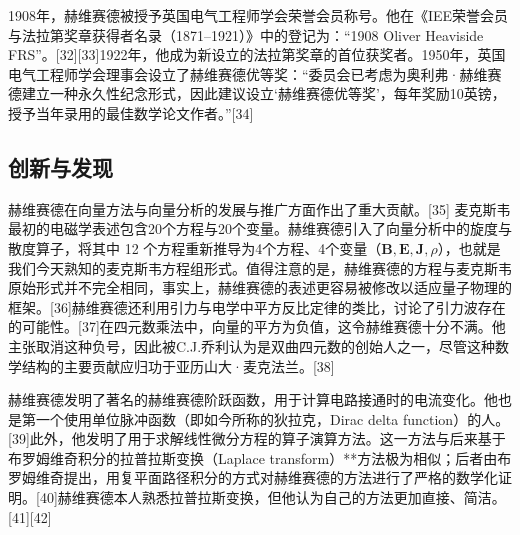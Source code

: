 1908年，赫维赛德被授予英国电气工程师学会荣誉会员称号。他在《IEE荣誉会员与法拉第奖章获得者名录（1871–1921）》中的登记为：“1908 Oliver Heaviside FRS”。[32][33]1922年，他成为新设立的法拉第奖章的首位获奖者。1950年，英国电气工程师学会理事会设立了赫维赛德优等奖：“委员会已考虑为奥利弗·赫维赛德建立一种永久性纪念形式，因此建议设立‘赫维赛德优等奖’，每年奖励10英镑，授予当年录用的最佳数学论文作者。”[34]
\subsection{创新与发现}
赫维赛德在向量方法与向量分析的发展与推广方面作出了重大贡献。[35] 麦克斯韦最初的电磁学表述包含20个方程与20个变量。赫维赛德引入了向量分析中的旋度与散度算子，将其中 12 个方程重新推导为4个方程、4个变量（$\mathbf{B}, \mathbf{E}, \mathbf{J}, \rho$），也就是我们今天熟知的麦克斯韦方程组形式。值得注意的是，赫维赛德的方程与麦克斯韦原始形式并不完全相同，事实上，赫维赛德的表述更容易被修改以适应量子物理的框架。[36]赫维赛德还利用引力与电学中平方反比定律的类比，讨论了引力波存在的可能性。[37]在四元数乘法中，向量的平方为负值，这令赫维赛德十分不满。他主张取消这种负号，因此被C.J.乔利认为是双曲四元数的创始人之一，尽管这种数学结构的主要贡献应归功于亚历山大·麦克法兰。[38]

赫维赛德发明了著名的赫维赛德阶跃函数，用于计算电路接通时的电流变化。他也是第一个使用单位脉冲函数（即如今所称的狄拉克，Dirac delta function）的人。[39]此外，他发明了用于求解线性微分方程的算子演算方法。这一方法与后来基于布罗姆维奇积分的拉普拉斯变换（Laplace transform）**方法极为相似；后者由布罗姆维奇提出，用复平面路径积分的方式对赫维赛德的方法进行了严格的数学化证明。[40]赫维赛德本人熟悉拉普拉斯变换，但他认为自己的方法更加直接、简洁。[41][42]
